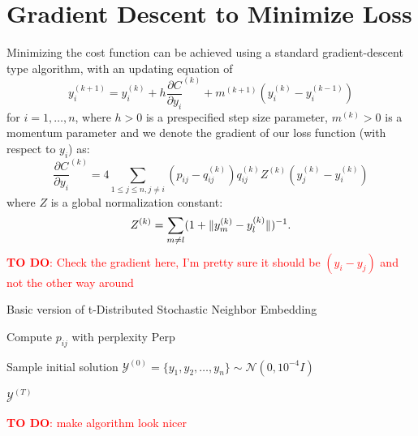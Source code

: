 \section{Gradient Descent to Minimize Loss}
Minimizing the cost function can be achieved using a standard gradient-descent type algorithm, with an updating equation of 
\begin{equation}
    y_i^{(k+1)} = y_i^{(k)} + h \frac{\partial C}{\partial y_i}^{(k)} + m^{(k+1)}(y_i^{(k)} - y_i^{(k-1)}) 
\end{equation}
for $i=1,\dots,n$, where $h >0$ is a prespecified step size parameter, $m^{(k)} > 0$ is a momentum parameter and we denote the gradient of our loss function (with respect to $y_i$) as: 
\begin{equation}
    \frac{\partial C}{\partial y_i}^{(k)} = 4 \sum_{1 \leq j \leq n, j \neq i} (p_{ij} - q_{ij}^{(k)}) q_{ij}^{(k)} Z^{(k)} (y_j^{(k)} - y_i^{(k)})
\end{equation}
where $Z$ is a global normalization constant: 
\begin{equation}
    Z^{(k)} = \sum_{m \neq l} (1 + \lVert y_m^{(k)} - y_l^{(k)}\rVert)^{-1}. 
\end{equation}
\textcolor{red}{\textbf{TO DO}: Check the gradient here, I'm pretty sure it should be $(y_i - y_j)$ and not the other way around}


\begin{algorithm}[H]
    \caption{Basic version of t-Distributed Stochastic Neighbor Embedding}
    \label{alg:tsne}


    Compute $p_{ij}$ with perplexity $\text{Perp}$ 
    
    Sample initial solution $\mathcal{Y}^{(0)} = \{y_1, y_2, \dots, y_n\} \sim \mathcal{N}(0, 10^{-4} I)$\


    \Return $\mathcal{Y}^{(T)}$\
\end{algorithm}
\textcolor{red}{\textbf{TO DO}: make algorithm look nicer}

